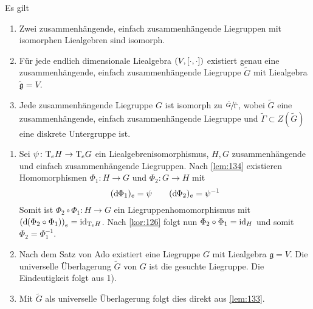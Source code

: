 \begin{satz}[{name=[{Liegruppen-Liealgebren-Zusammenhang im einfach zusammenhängenden Fall}]}]
	Es gilt
	\begin{enumerate}[1)]
		\item Zwei zusammenhängende, einfach zusammenhängende Liegruppen mit isomorphen Liealgebren sind isomorph.
		\item Für jede endlich dimensionale Liealgebra $(V, \benbrace*{\cdot,\cdot })$ existiert genau eine zusammenhängende, einfach zusammenhängende Liegruppe $\tilde{G}$ mit Liealgebra $\tilde{\mathfrak{g}}=V$.
		\item Jede zusammenhängende Liegruppe $G$ ist isomorph zu $\sfrac{\tilde{G}}{\tilde{\Gamma}}$, wobei $\tilde{G}$ eine zusammenhängende, einfach zusammenhängende Liegruppe und $\tilde{\Gamma} \subset Z(\tilde{G})$ eine diskrete Untergruppe ist.
	\end{enumerate}
\end{satz}
\begin{beweis}
	\begin{enumerate}[1)]
		\item Sei $\psi \colon \Tmap_e H \to \Tmap_e G$ ein Liealgebrenisomorphismus, $H,G$ zusammenhängende und einfach zusammenhängende Liegruppen.
		Nach \autoref{lem:134} existieren Homomorphismen $\Phi_1 \colon H \to G$ und $\Phi_2 \colon G \to H$ mit
		\[
			(\mathd \Phi_1)_e = \psi \qquad (\mathd \Phi_2)_e = \psi^{-1}
		\]
		Somit ist $\Phi_2 \circ  \Phi_1 \colon H \to G$ ein Liegruppenhomomorphismus mit $\enbrace*{\mathd (\Phi_2 \circ \Phi_1)}_e = \id_{\Tmap_e H}$.
		Nach \autoref{kor:126} folgt nun $\Phi_2 \circ \Phi_1= \id_H$ und somit $\Phi_2 = \Phi_1^{-1}$.
		\item Nach dem Satz von Ado existiert eine Liegruppe $G$ mit Liealgebra $\mathfrak{g}=V$.
		Die universelle Überlagerung $\tilde{G}$ von $G$ ist die gesuchte Liegruppe.
		Die Eindeutigkeit folgt aus 1).
		\item Mit $\widetilde{G}$ als universelle Überlagerung folgt dies direkt aus \autoref{lem:133}.\qedhere
	\end{enumerate}
\end{beweis}

